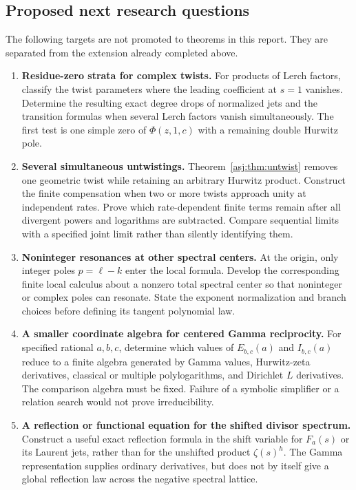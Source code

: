 \subsection{Proposed next research questions}
The following targets are not promoted to theorems in this report.
They are separated from the extension already completed above.
\begin{enumerate}[leftmargin=*,label=\textbf{Q\arabic*.},itemsep=7pt]
\item \textbf{Residue-zero strata for complex twists.}
For products of Lerch factors, classify the twist parameters where the
leading coefficient at $s=1$ vanishes. Determine the resulting exact
degree drops of normalized jets and the transition formulas when several
Lerch factors vanish simultaneously. The first test is one simple zero
of $\Phi(z,1,c)$ with a remaining double Hurwitz pole.

\item \textbf{Several simultaneous untwistings.}
Theorem~\ref{asj:thm:untwist} removes one geometric twist while retaining an
arbitrary Hurwitz product. Construct the finite compensation when two
or more twists approach unity at independent rates. Prove which
rate-dependent finite terms remain after all divergent powers and
logarithms are subtracted. Compare sequential limits with a specified
joint limit rather than silently identifying them.

\item \textbf{Noninteger resonances at other spectral centers.}
At the origin, only integer poles $p=\ell-k$ enter the local formula.
Develop the corresponding finite local calculus about a nonzero total
spectral center so that noninteger or complex poles can resonate.
State the exponent normalization and branch choices before defining
its tangent polynomial law.

\item \textbf{A smaller coordinate algebra for centered Gamma reciprocity.}
For specified rational $a,b,c$, determine which values of $E_{b,c}(a)$
and $I_{b,c}(a)$ reduce to a finite algebra generated by Gamma values,
Hurwitz-zeta derivatives, classical or multiple polylogarithms, and
Dirichlet $L$ derivatives. The comparison algebra must be fixed.
Failure of a symbolic simplifier or a relation search would not prove
irreducibility.

\item \textbf{A reflection or functional equation for the shifted divisor spectrum.}
Construct a useful exact reflection formula in the shift variable for
$F_a(s)$ or its Laurent jets, rather than for the unshifted product
$\zeta(s)^h$. The Gamma representation supplies ordinary derivatives,
but does not by itself give a global reflection law across the negative
spectral lattice.


\end{enumerate}
